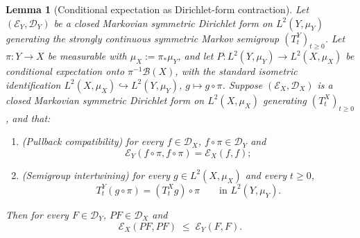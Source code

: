 \documentclass[11pt,reqno]{amsart}
\theoremstyle{plain}
\newtheorem{lemma}[theorem]{Lemma}
\theoremstyle{definition}
\theoremstyle{remark}
\newcommand{\cD}{\mathcal D}
\newcommand{\cE}{\mathcal E}
\begin{document}
\begin{lemma}[Conditional expectation as Dirichlet-form contraction]\label{lem:abstract-factor}
Let $(\cE_{Y},\cD_{Y})$ be a closed Markovian symmetric Dirichlet
form on $L^{2}(Y,\mu_{Y})$ generating the strongly continuous
symmetric Markov semigroup $(T_{t}^{Y})_{t\ge 0}$. Let
$\pi\colon Y\to X$ be measurable with
$\mu_{X}:=\pi_{*}\mu_{Y}$, and let
$P\colon L^{2}(Y,\mu_{Y})\to L^{2}(X,\mu_{X})$ be conditional
expectation onto $\pi^{-1}\mathcal B(X)$, with the standard
isometric identification $L^{2}(X,\mu_{X})\hookrightarrow L^{2}(Y,\mu_{Y})$,
$g\mapsto g\circ\pi$. Suppose $(\cE_{X},\cD_{X})$ is a closed
Markovian symmetric Dirichlet form on $L^{2}(X,\mu_{X})$ generating
$(T_{t}^{X})_{t\ge 0}$, and that:
\begin{enumerate}
\item[$(\mathrm i)$] (\emph{Pullback compatibility}) for every
$f\in\cD_{X}$, $f\circ\pi\in\cD_{Y}$ and
\begin{equation}\label{eq:pullback-compat}
  \cE_{Y}(f\circ\pi,f\circ\pi)=\cE_{X}(f,f);
\end{equation}
\item[$(\mathrm{ii})$] (\emph{Semigroup intertwining}) for every
$g\in L^{2}(X,\mu_{X})$ and every $t\ge 0$,
\begin{equation}\label{eq:semigroup-intertwine}
  T_{t}^{Y}(g\circ\pi)=(T_{t}^{X}g)\circ\pi
  \qquad\text{in }L^{2}(Y,\mu_{Y}).
\end{equation}
\end{enumerate}
Then for every $F\in\cD_{Y}$, $PF\in\cD_{X}$ and
\begin{equation}\label{eq:CE-contraction}
  \cE_{X}(PF,PF)\;\le\;\cE_{Y}(F,F).
\end{equation}
\end{lemma}
\end{document}
